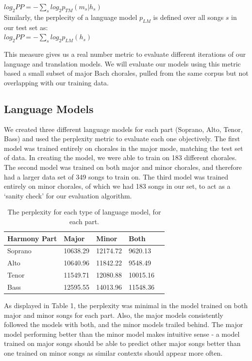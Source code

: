 \documentclass{sig-alternate}
\begin{document}
$log_2 PP = - \sum_{s} log_2 p_{TM}(m_s|h_s)$\\

Similarly, the perplecity of a language model $p_{LM}$ is defined over all songs $s$ in our test set as:\\

$log_2 PP = - \sum_{s} log_2 p_{LM}(h_s)$

This measure gives us a real number metric to evaluate different iterations of our language and translation models. We will evaluate our models using this metric based a small subset of major Bach chorales, pulled from the same corpus but not overlapping with our training data.

\subsection{Language Models}
We created three different language models for each part (Soprano, Alto, Tenor, Bass) and used the perplexity metric to evaluate each one objectively. The first model was trained entirely on chorales in the major mode, matching the test set of data. In creating the model, we were able to train on 183 different chorales. The second model was trained on both major and minor chorales, and therefore had a larger data set of 349 songs to train on. The third model was trained entirely on minor chorales, of which we had 183 songs in our set, to act as a `sanity check' for our evaluation algorithm.
\begin{table}[h]
  \begin{center}
      \begin{tabular}{| l | l | l | l | l |}
      \hline
       Harmony Part & Major & Minor & Both \\ \hline
       Soprano &  10638.29 & 12174.72 & 9620.13  \\ \hline
       Alto &  10640.96 & 11842.22 & 9548.49 \\ \hline
       Tenor & 11549.71 & 12080.88 & 10015.16 \\ \hline
       Bass & 12595.55 & 14013.96 & 11548.36 \\ \hline
      \end{tabular}
  \end{center}
  \caption{The perplexity for each type of language model, for each part.}
\end{table}

As displayed in Table 1, the perplexity was minimal in the model trained on both major and minor songs for each part. Also, the major models consistently followed the models with both, and the minor models trailed behind. The major model performing better than the minor model makes intuitive sense - a model trained on major songs should be able to predict other major songs better than one trained on minor songs as similar contexts should appear more often. 
\end{document}
